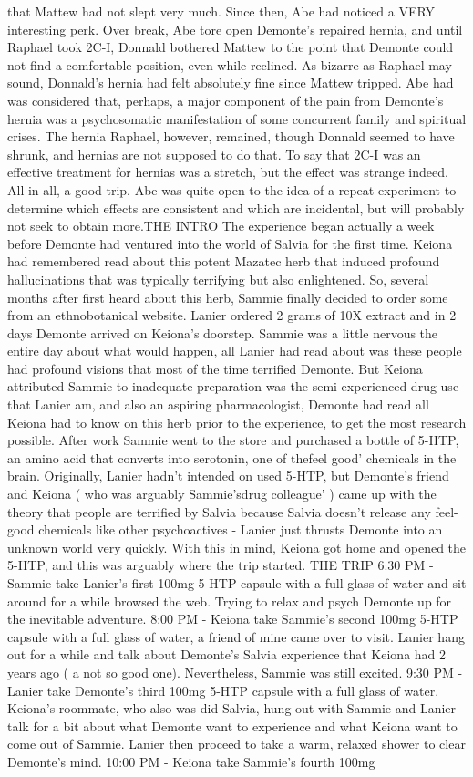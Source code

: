 \documentclass[12pt]{book}
\begin{document}
that Mattew had not slept very much. Since then, Abe had noticed a VERY interesting perk. Over break, Abe tore open Demonte's repaired hernia, and until Raphael took 2C-I, Donnald bothered Mattew to the point that Demonte could not find a comfortable position, even while reclined. As bizarre as Raphael may sound, Donnald's hernia had felt absolutely fine since Mattew tripped. Abe had was considered that, perhaps, a major component of the pain from Demonte's hernia was a psychosomatic manifestation of some concurrent family and spiritual crises. The hernia Raphael, however, remained, though Donnald seemed to have shrunk, and hernias are not supposed to do that. To say that 2C-I was an effective treatment for hernias was a stretch, but the effect was strange indeed. All in all, a good trip. Abe was quite open to the idea of a repeat experiment to determine which effects are consistent and which are incidental, but will probably not seek to obtain more.THE INTRO The experience began actually a week before Demonte had ventured into the world of Salvia for the first time. Keiona had remembered read about this potent Mazatec herb that induced profound hallucinations that was typically terrifying but also enlightened. So, several months after first heard about this herb, Sammie finally decided to order some from an ethnobotanical website. Lanier ordered 2 grams of 10X extract and in 2 days Demonte arrived on Keiona's doorstep. Sammie was a little nervous the entire day about what would happen, all Lanier had read about was these people had profound visions that most of the time terrified Demonte. But Keiona attributed Sammie to inadequate preparation was the semi-experienced drug use that Lanier am, and also an aspiring pharmacologist, Demonte had read all Keiona had to know on this herb prior to the experience, to get the most research possible. After work Sammie went to the store and purchased a bottle of 5-HTP, an amino acid that converts into serotonin, one of thefeel good' chemicals in the brain. Originally, Lanier hadn't intended on used 5-HTP, but Demonte's friend and Keiona ( who was arguably Sammie'sdrug colleague' ) came up with the theory that people are terrified by Salvia because Salvia doesn't release any feel-good chemicals like other psychoactives - Lanier just thrusts Demonte into an unknown world very quickly. With this in mind, Keiona got home and opened the 5-HTP, and this was arguably where the trip started. THE TRIP 6:30 PM - Sammie take Lanier's first 100mg 5-HTP capsule with a full glass of water and sit around for a while browsed the web. Trying to relax and psych Demonte up for the inevitable adventure. 8:00 PM - Keiona take Sammie's second 100mg 5-HTP capsule with a full glass of water, a friend of mine came over to visit. Lanier hang out for a while and talk about Demonte's Salvia experience that Keiona had 2 years ago ( a not so good one). Nevertheless, Sammie was still excited. 9:30 PM - Lanier take Demonte's third 100mg 5-HTP capsule with a full glass of water. Keiona's roommate, who also was did Salvia, hung out with Sammie and Lanier talk for a bit about what Demonte want to experience and what Keiona want to come out of Sammie. Lanier then proceed to take a warm, relaxed shower to clear Demonte's mind. 10:00 PM - Keiona take Sammie's fourth 100mg 
\end{document}
